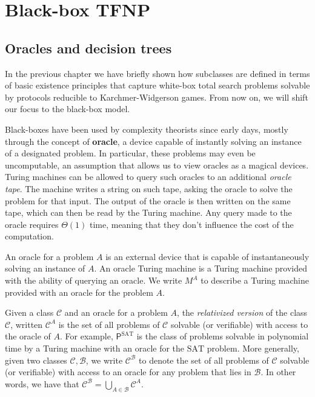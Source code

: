 
\chapter{Black-box TFNP} \label{chap:bb-tfnp}

\section{Oracles and decision trees}

In the previous chapter we have briefly shown how \TFNP subclasses are defined in terms of basic existence principles that capture white-box total search problems solvable by protocols reducible to Karchmer-Widgerson games. From now on, we will shift our focus to the black-box model.

Black-boxes have been used by complexity theorists since early days, mostly through the concept of \textbf{oracle}, a device capable of instantly solving an instance of a designated problem. In particular, these problems may even be uncomputable, an assumption that allows us to view oracles as a magical devices. Turing machines can be allowed to query such oracles to an additional \textit{oracle tape}. The machine writes a string on such tape, asking the oracle to solve the problem for that input. The output of the oracle is then written on the same tape, which can then be read by the Turing machine. Any query made to the oracle requires $\Theta(1)$ time, meaning that they don't influence the cost of the computation.

\begin{definition}
    An oracle for a problem $A$ is an external device that is capable of instantaneously solving an instance of $A$. An oracle Turing machine is a Turing machine provided with the ability of querying an oracle. We write $M^A$ to describe a Turing machine provided with an oracle for the problem $A$.
\end{definition}

Given a class $\mathcal{C}$ and an oracle for a problem $A$, the \textit{relativized version} of the class $\mathcal{C}$, written $\mathcal{C}^A$ is the set of all problems of $\mathcal{C}$ solvable (or verifiable) with access to the oracle of $A$. For example, $\mathsf{P}^{\mathrm{SAT}}$ is the class of problems solvable in polynomial time by a Turing machine with an oracle for the $\mathrm{SAT}$ problem. More generally, given two classes $\mathcal{C}, \mathcal{B}$, we write $\mathcal{C}^{\mathcal{B}}$ to denote the set of all problems of $\mathcal{C}$ solvable (or verifiable) with access to an oracle for any problem that lies in $\mathcal{B}$. In other words, we have that $\mathcal{C}^{\mathcal{B}} = \bigcup_{A \in \mathcal{B}} \mathcal{C}^{A}$.

